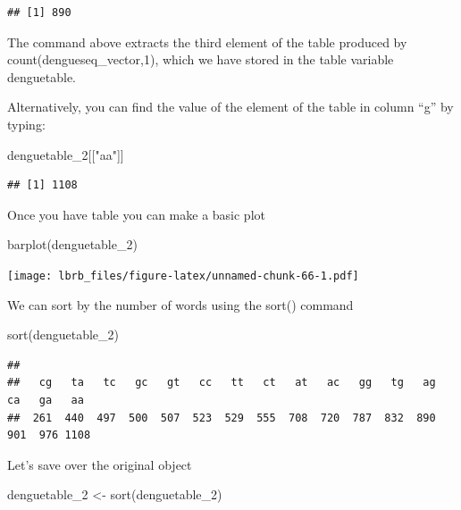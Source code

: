 \documentclass[
]{book}
\newenvironment{Shaded}{\begin{snugshade}}{\end{snugshade}}
\newcommand{\FunctionTok}[1]{\textcolor[rgb]{0.00,0.00,0.00}{#1}}
\newcommand{\NormalTok}[1]{#1}
\newcommand{\OtherTok}[1]{\textcolor[rgb]{0.56,0.35,0.01}{#1}}
\newcommand{\StringTok}[1]{\textcolor[rgb]{0.31,0.60,0.02}{#1}}
\begin{document}
\begin{verbatim}
## [1] 890
\end{verbatim}

The command above extracts the third element of the table produced by count(dengueseq\_vector,1), which we have stored in the table variable denguetable.

Alternatively, you can find the value of the element of the table in column ``g'' by typing:

\begin{Shaded}
\begin{Highlighting}[]
\NormalTok{denguetable\_2[[}\StringTok{"aa"}\NormalTok{]]}
\end{Highlighting}
\end{Shaded}

\begin{verbatim}
## [1] 1108
\end{verbatim}

Once you have table you can make a basic plot

\begin{Shaded}
\begin{Highlighting}[]
\FunctionTok{barplot}\NormalTok{(denguetable\_2)}
\end{Highlighting}
\end{Shaded}

\texttt{[image: lbrb\_files/figure-latex/unnamed-chunk-66-1.pdf]}

We can sort by the number of words using the sort() command

\begin{Shaded}
\begin{Highlighting}[]
\FunctionTok{sort}\NormalTok{(denguetable\_2)}
\end{Highlighting}
\end{Shaded}

\begin{verbatim}
## 
##   cg   ta   tc   gc   gt   cc   tt   ct   at   ac   gg   tg   ag   ca   ga   aa 
##  261  440  497  500  507  523  529  555  708  720  787  832  890  901  976 1108
\end{verbatim}

Let's save over the original object

\begin{Shaded}
\begin{Highlighting}[]
\NormalTok{denguetable\_2 }\OtherTok{\textless{}{-}} \FunctionTok{sort}\NormalTok{(denguetable\_2)}
\end{Highlighting}
\end{Shaded}
\end{document}
